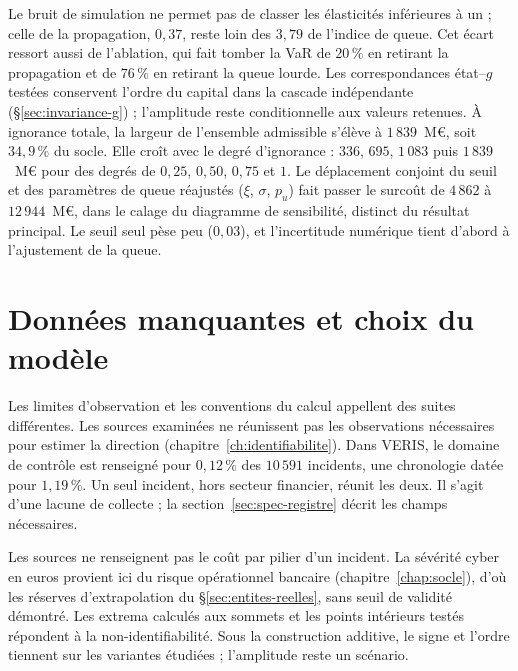 \vspace{4pt}
\noindent Le bruit de simulation ne permet pas de classer les élasticités inférieures à un ; celle de la propagation, $0{,}37$, reste loin des
$3{,}79$ de l'indice de queue. Cet écart ressort aussi de l'ablation, qui fait tomber la VaR de
$20\,\%$ en retirant la propagation et de $76\,\%$ en retirant la queue lourde. Les correspondances état--$g$ testées conservent l'ordre du capital dans la cascade indépendante
(\S\ref{sec:invariance-g}) ; l'amplitude reste conditionnelle aux valeurs retenues.
À ignorance totale, la largeur de l'ensemble admissible s'élève à $1\,839$~M\euro, soit $34{,}9\,\%$
du socle. Elle croît avec le degré d'ignorance : $336$, $695$, $1\,083$ puis $1\,839$~M\euro{} pour
des degrés de $0{,}25$, $0{,}50$, $0{,}75$ et $1$. Le déplacement
conjoint du seuil et des paramètres de queue réajustés ($\xi$, $\sigma$, $p_u$) fait passer le
surcoût de $4\,862$ à $12\,944$~M\euro, dans le calage du diagramme de sensibilité, distinct du résultat principal.
Le seuil seul pèse peu ($0{,}03$), et l'incertitude numérique tient d'abord à l'ajustement de la queue.

\section{Données manquantes et choix du modèle}
\label{sec:deux-natures-limites}


Les limites d'observation et les conventions du calcul appellent des suites différentes.
Les sources examinées ne réunissent pas les observations nécessaires pour estimer la direction
(chapitre~\ref{ch:identifiabilite}). Dans VERIS, le domaine de contrôle est renseigné pour
$0{,}12\,\%$ des $10\,591$ incidents, une chronologie datée pour $1{,}19\,\%$.
Un seul incident, hors secteur financier, réunit les deux. Il s'agit d'une lacune de collecte ;
la section~\ref{sec:spec-registre} décrit les champs nécessaires.

Les sources ne renseignent pas le coût par pilier d'un incident. La sévérité cyber
en euros provient ici du risque opérationnel bancaire (chapitre~\ref{chap:socle}),
d'où les réserves d'extrapolation du \S\ref{sec:entites-reelles}, sans seuil de validité démontré.
Les extrema calculés aux sommets et les points intérieurs testés répondent à la
non-identifiabilité. Sous la construction additive, le signe et l'ordre tiennent
sur les variantes étudiées ; l'amplitude reste un scénario.

